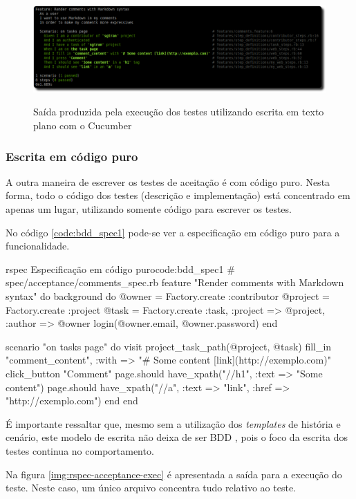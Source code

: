 \begin{figure}[h]
  \center
  \caption{Saída produzida pela execução dos testes utilizando escrita em texto plano com o Cucumber}
  \includegraphics[scale=0.4]{images/cucumber-exec}
  \label{img:cucumber-exec}
\end{figure}


\subsubsection{Escrita em código puro}
\label{ssub:Escrita em codigo puro}

A outra maneira de escrever os testes de aceitação é com código puro. Nesta forma, todo o código dos testes (descrição e implementação) está concentrado em apenas um lugar, utilizando somente código para escrever os testes.

No código \ref{code:bdd_spec1} pode-se ver a especificação em código puro para a funcionalidade.

\begin{mycode}{rspec}%
{Especificação em código puro}{code:bdd_spec1}
# spec/acceptance/comments_spec.rb
feature "Render comments with Markdown syntax" do
  background do
    @owner = Factory.create :contributor
    @project = Factory.create :project
    @task = Factory.create :task, :project => @project, :author => @owner
    login(@owner.email, @owner.password)
  end

  scenario "on tasks page" do
    visit project_task_path(@project, @task)
    fill_in "comment_content", :with => "# Some content [link](http://exemplo.com)"
    click_button "Comment"
    page.should have_xpath("//h1", :text => "Some content")
    page.should have_xpath("//a", :text => "link", :href => "http://exemplo.com")
  end
end
\end{mycode}

É importante ressaltar que, mesmo sem a utilização dos \textit{templates} de história e cenário, este modelo de escrita não deixa de ser BDD \cite{BDDSolis}, pois o foco da escrita dos testes continua no comportamento.

Na figura \ref{img:rspec-acceptance-exec} é apresentada a saída para a execução do teste. Neste caso, um único arquivo concentra tudo relativo ao teste.

